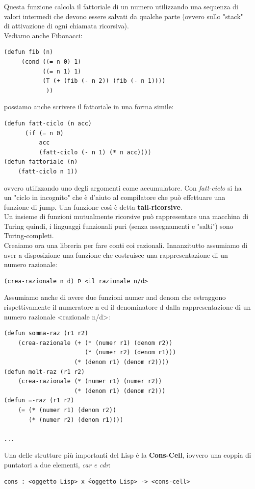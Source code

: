 \documentclass[a4paper,12pt, oneside]{book}
\begin{document}
Questa funzione calcola il fattoriale di un numero utilizzando
una sequenza di valori intermedi che devono essere salvati da
qualche parte (ovvero sullo "stack" di attivazione di ogni
chiamata ricorsiva). \\
Vediamo anche Fibonacci:
\begin{verbatim}
(defun fib (n)
     (cond ((= n 0) 1)
           ((= n 1) 1)
           (T (+ (fib (- n 2)) (fib (- n 1))))
            ))
\end{verbatim}
possiamo anche scrivere il fattoriale in una forma simile:
\begin{verbatim}
(defun fatt-ciclo (n acc)
      (if (= n 0)
          acc
          (fatt-ciclo (- n 1) (* n acc))))
(defun fattoriale (n)
    (fatt-ciclo n 1))
\end{verbatim}
ovvero utilizzando uno degli argomenti come accumulatore. Con \textit{fatt-ciclo} si ha un "ciclo in incognito" che è d'aiuto al compilatore che può effettuare una funzione di jump. Una funzione così è detta \textbf{tail-ricorsive}.\\
Un insieme di funzioni mutualmente ricorsive può rappresentare una
macchina di Turing quindi, i linguaggi funzionali puri (senza assegnamenti e "salti") sono Turing-completi.\\
Creaiamo ora una libreria per fare conti coi razionali. Innanzitutto assumiamo di aver a disposizione una funzione che
costruisce una rappresentazione di un numero razionale:
\begin{verbatim}
(crea-razionale n d) Þ <il razionale n/d>
\end{verbatim}
Assumiamo anche di avere due funzioni numer and denom che
estraggono rispettivamente il numeratore n ed il denominatore d dalla
rappresentazione di un numero razionale <razionale n/d>:
\begin{verbatim}
(defun somma-raz (r1 r2)
    (crea-razionale (+ (* (numer r1) (denom r2))
                       (* (numer r2) (denom r1)))
                    (* (denom r1) (denom r2))))
(defun molt-raz (r1 r2)
    (crea-razionale (* (numer r1) (numer r2))
                    (* (denom r1) (denom r2)))
(defun =-raz (r1 r2)
    (= (* (numer r1) (denom r2))
       (* (numer r2) (denom r1))))
       
...
\end{verbatim}
Una delle strutture più importanti del Lisp è la \textbf{Cons-Cell}, iovvero una coppia di puntatori a due elementi, \textit{car e cdr}:
\begin{verbatim}
cons : <oggetto Lisp> x ́<oggetto Lisp> -> <cons-cell>
\end{verbatim}
\end{document}
